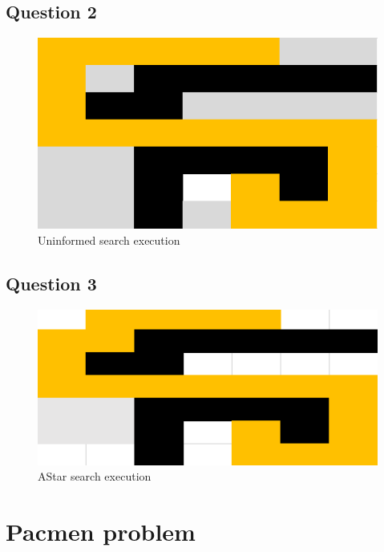 \documentclass[a4paper,11pt]{article}
\begin{document}
	\subsection{Question 2}
		\begin{figure}[h!]
			\centering
			\includegraphics[scale=1]{uniform_search}
			\caption{Uninformed search execution}
		\end{figure}
	\subsection{Question 3}
		\begin{figure}[h!]
			\centering
			\includegraphics[scale=1.35]{astar_search}
			\caption{AStar search execution}
		\end{figure}
	
\section{Pacmen problem}
\end{document}
